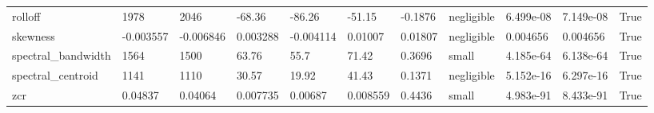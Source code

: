 \begin{table}
\begin{tabular}{llllllllllr}
rolloff & 1978 & 2046 & -68.36 & -86.26 & -51.15 & -0.1876 & negligible & 6.499e-08 & 7.149e-08 & True \\
skewness & -0.003557 & -0.006846 & 0.003288 & -0.004114 & 0.01007 & 0.01807 & negligible & 0.004656 & 0.004656 & True \\
spectral_bandwidth & 1564 & 1500 & 63.76 & 55.7 & 71.42 & 0.3696 & small & 4.185e-64 & 6.138e-64 & True \\
spectral_centroid & 1141 & 1110 & 30.57 & 19.92 & 41.43 & 0.1371 & negligible & 5.152e-16 & 6.297e-16 & True \\
zcr & 0.04837 & 0.04064 & 0.007735 & 0.00687 & 0.008559 & 0.4436 & small & 4.983e-91 & 8.433e-91 & True \\
\bottomrule
\end{tabular}
\end{table}
